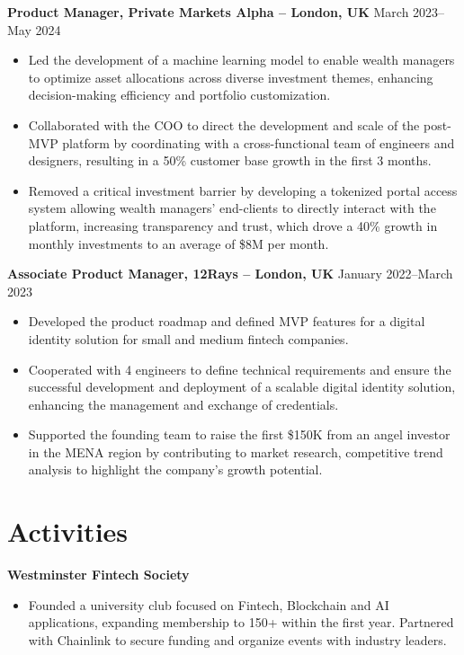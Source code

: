 \documentclass{article}
\begin{document}
\textbf{Product Manager, Private Markets Alpha -- London, UK} \hfill March 2023--May 2024
\begin{itemize}[leftmargin=*,noitemsep,topsep=0pt]
    \item Led the development of a machine learning model to enable wealth managers to optimize asset allocations across diverse investment themes, enhancing decision-making efficiency and portfolio customization.
    \item Collaborated with the COO to direct the development and scale of the post-MVP platform by coordinating with a cross-functional team of engineers and designers, resulting in a 50\% customer base growth in the first 3 months.
    \item Removed a critical investment barrier by developing a tokenized portal access system allowing wealth managers' end-clients to directly interact with the platform, increasing transparency and trust, which drove a 40\% growth in monthly investments to an average of \$8M per month.
\end{itemize}

\textbf{Associate Product Manager, 12Rays -- London, UK} \hfill January 2022--March 2023
\begin{itemize}[leftmargin=*,noitemsep,topsep=0pt]
    \item Developed the product roadmap and defined MVP features for a digital identity solution for small and medium fintech companies.
    \item Cooperated with 4 engineers to define technical requirements and ensure the successful development and deployment of a scalable digital identity solution, enhancing the management and exchange of credentials.
    \item Supported the founding team to raise the first \$150K from an angel investor in the MENA region by contributing to market research, competitive trend analysis to highlight the company's growth potential.
\end{itemize}

\section*{Activities}
\textbf{Westminster Fintech Society}
\begin{itemize}[leftmargin=*,noitemsep,topsep=0pt]
    \item Founded a university club focused on Fintech, Blockchain and AI applications, expanding membership to 150+ within the first year. Partnered with Chainlink to secure funding and organize events with industry leaders.
\end{itemize}
\end{document}
